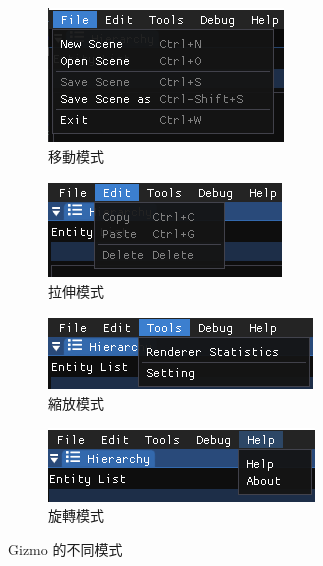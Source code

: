 \begin{figure}[h]
    \begin{subfigure}[b]{0.5\linewidth}
        \includegraphics[width=\linewidth]{./resources/editor/a.png} 
        \caption{移動模式}
    \end{subfigure}
    \begin{subfigure}[b]{0.5\linewidth}
        \includegraphics[width=\linewidth]{./resources/editor/b.png}
        \caption{拉伸模式}
    \end{subfigure}
    \begin{subfigure}[b]{0.5\linewidth}
        \includegraphics[width=\linewidth]{./resources/editor/c.png}
        \caption{縮放模式}
    \end{subfigure}
    \begin{subfigure}[b]{0.5\linewidth}
        \includegraphics[width=\linewidth]{./resources/editor/d.png}
        \caption{旋轉模式}
    \end{subfigure}
\caption{Gizmo 的不同模式}
\label{fig:MenuBar}
\end{figure}

